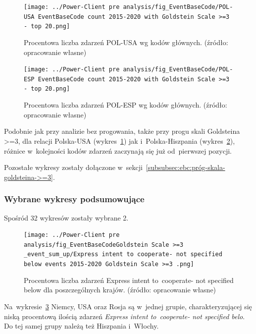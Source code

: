 \documentclass[11pt]{report}
\begin{document}
    \begin{figure}[tp]
        \centering
        \texttt{[image: ../Power-Client pre analysis/fig\_EventBaseCode/POL-USA EventBaseCode count 2015-2020 with Goldstein Scale >=3 - top 20.png]}
        \caption{Procentowa liczba zdarzeń POL-USA wg kodów głównych. (źródło: opracowanie własne)}
        \label{fig:Power-Client:EBC:Goldstein:POL-USA}
    \end{figure}

    \begin{figure}[tp]
        \centering
        \texttt{[image: ../Power-Client pre analysis/fig\_EventBaseCode/POL-ESP EventBaseCode count 2015-2020 with Goldstein Scale >=3 - top 20.png]}
        \caption{Procentowa liczba zdarzeń POL-ESP wg kodów głównych. (źródło: opracowanie własne)}
        \label{fig:Power-Client:EBC:Goldstein:POL-ESP}
    \end{figure}

    Podobnie jak przy analizie bez progowania, także przy progu skali Goldsteina >=3, dla relacji Polska-USA (wykres~\ref{fig:Power-Client:EBC:Goldstein:POL-USA}) jak i~Polska-Hiszpania (wykres~\ref{fig:Power-Client:EBC:Goldstein:POL-ESP}),
    różnice w~kolejności kodów zdarzeń zaczynają się już od~pierwszej pozycji.

    Pozostałe wykresy zostały dołączone w~sekcji~\ref{subsubsec:ebc:próg-skala-goldsteina->=3}.

    \subsubsection{Wybrane wykresy podsumowujące}

    Spośród 32 wykresów zostały wybrane 2.

    \begin{figure}[tp]
        \centering
        \texttt{[image: ../Power-Client pre analysis/fig\_EventBaseCodeGoldstein Scale >=3 \_event\_sum\_up/Express intent to cooperate- not specified below events 2015-2020 Goldstein Scale >=3 .png]}
        \caption{Procentowa liczba zdarzeń Express intent to~cooperate- not specified below dla poszczególnych krajów. (źródło: opracowanie własne)}
        \label{fig:Power-Client:ERC:Goldstein:SumUp:Express intent to cooperate- not specified below}
    \end{figure}

    Na~wykresie~\ref{fig:Power-Client:ERC:Goldstein:SumUp:Express intent to cooperate- not specified below} Niemcy, USA oraz Rosja są w~jednej grupie,
    charakteryzującej się niską procentową ilością zdarzeń \textit{Express intent to~cooperate- not specified belo}.
    Do tej samej grupy należą też Hiszpania i~Włochy.
\end{document}
